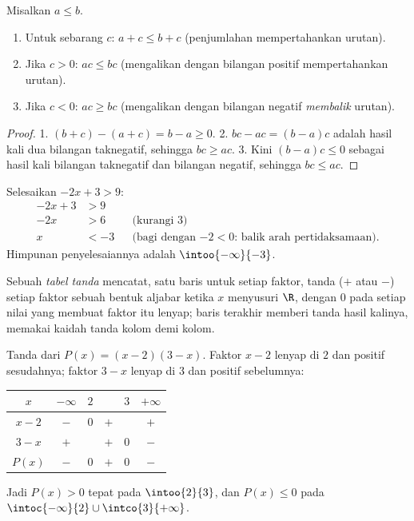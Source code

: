 \begin{proposition}\label{prop:g10:algebra:ineqrules}
Misalkan $a \leq b$.
\begin{enumerate}
  \item Untuk sebarang $c$: $a + c \leq b + c$ (penjumlahan mempertahankan
        urutan).
  \item Jika $c > 0$: $ac \leq bc$ (mengalikan dengan bilangan positif
        mempertahankan urutan).
  \item Jika $c < 0$: $ac \geq bc$ (mengalikan dengan bilangan negatif
        \emph{membalik} urutan).
\end{enumerate}
\end{proposition}

\begin{proof}
1. $(b + c) - (a + c) = b - a \geq 0$.
2. $bc - ac = (b-a)c$ adalah hasil kali dua bilangan taknegatif, sehingga
$bc \geq ac$.
3. Kini $(b-a)c \leq 0$ sebagai hasil kali bilangan taknegatif dan bilangan
negatif, sehingga $bc \leq ac$.
\end{proof}

\begin{example}\label{ex:g10:algebra:firstineq}
Selesaikan $-2x + 3 > 9$:
\begin{align*}
-2x + 3 &> 9 \\
-2x &> 6 && \text{(kurangi 3)} \\
x &< -3 && \text{(bagi dengan $-2 < 0$: balik arah pertidaksamaan).}
\end{align*}
Himpunan penyelesaiannya adalah $\intoo{-\infty}{-3}$.
\end{example}

\begin{definition}\label{def:g10:algebra:signtable}
Sebuah \emph{tabel tanda} mencatat, satu baris untuk setiap
faktor, tanda ($+$ atau $-$) setiap faktor sebuah bentuk aljabar ketika $x$
menyusuri $\R$, dengan $0$ pada setiap nilai yang membuat faktor itu lenyap;
baris terakhir memberi tanda hasil kalinya, memakai kaidah tanda kolom demi kolom.
\end{definition}

\begin{example}\label{ex:g10:algebra:signtable}
Tanda dari $P(x) = (x - 2)(3 - x)$. Faktor $x - 2$ lenyap di $2$ dan positif
sesudahnya; faktor $3 - x$ lenyap di $3$ dan positif sebelumnya:
\begin{center}
\renewcommand{\arraystretch}{1.3}
\begin{tabular}{c|ccccc}
$x$ & $-\infty$ \quad & $2$ & & $3$ & \quad $+\infty$ \\
\hline
$x - 2$ & $-$ & $0$ & $+$ & & $+$ \\
$3 - x$ & $+$ & & $+$ & $0$ & $-$ \\
\hline
$P(x)$ & $-$ & $0$ & $+$ & $0$ & $-$ \\
\end{tabular}
\end{center}
Jadi $P(x) > 0$ tepat pada $\intoo{2}{3}$, dan $P(x) \leq 0$ pada
$\intoc{-\infty}{2} \cup \intco{3}{+\infty}$.
\end{example}

